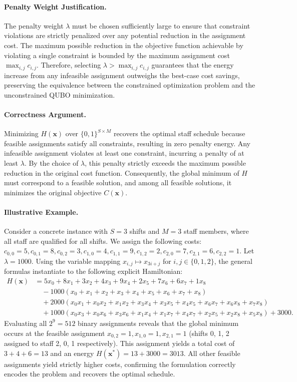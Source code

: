 \documentclass[12pt]{article}
\begin{document}
\paragraph{Penalty Weight Justification.}
The penalty weight $\lambda$ must be chosen sufficiently large to ensure that constraint violations are strictly penalized over any potential reduction in the assignment cost. The maximum possible reduction in the objective function achievable by violating a single constraint is bounded by the maximum assignment cost $\max_{i,j} c_{i,j}$. Therefore, selecting $\lambda > \max_{i,j} c_{i,j}$ guarantees that the energy increase from any infeasible assignment outweighs the best-case cost savings, preserving the equivalence between the constrained optimization problem and the unconstrained QUBO minimization.

\paragraph{Correctness Argument.}
Minimizing $H(\mathbf{x})$ over $\{0,1\}^{S \times M}$ recovers the optimal staff schedule because feasible assignments satisfy all constraints, resulting in zero penalty energy. Any infeasible assignment violates at least one constraint, incurring a penalty of at least $\lambda$. By the choice of $\lambda$, this penalty strictly exceeds the maximum possible reduction in the original cost function. Consequently, the global minimum of $H$ must correspond to a feasible solution, and among all feasible solutions, it minimizes the original objective $C(\mathbf{x})$.

\paragraph{Illustrative Example.}
Consider a concrete instance with $S=3$ shifts and $M=3$ staff members, where all staff are qualified for all shifts. We assign the following costs: $c_{0,0}=5, c_{0,1}=8, c_{0,2}=3, c_{1,0}=4, c_{1,1}=9, c_{1,2}=2, c_{2,0}=7, c_{2,1}=6, c_{2,2}=1$. Let $\lambda = 1000$. Using the variable mapping $x_{i,j} \mapsto x_{3i+j}$ for $i,j \in \{0,1,2\}$, the general formulas instantiate to the following explicit Hamiltonian:
\begin{align}
  H(\mathbf{x}) &= 5x_0 + 8x_1 + 3x_2 + 4x_3 + 9x_4 + 2x_5 + 7x_6 + 6x_7 + 1x_8 \nonumber \\
  &\quad - 1000(x_0 + x_1 + x_2 + x_3 + x_4 + x_5 + x_6 + x_7 + x_8) \nonumber \\
  &\quad + 2000(x_0x_1 + x_0x_2 + x_1x_2 + x_3x_4 + x_3x_5 + x_4x_5 + x_6x_7 + x_6x_8 + x_7x_8) \nonumber \\
  &\quad + 1000(x_0x_3 + x_0x_6 + x_3x_6 + x_1x_4 + x_1x_7 + x_4x_7 + x_2x_5 + x_2x_8 + x_5x_8) + 3000.
\end{align}
Evaluating all $2^9 = 512$ binary assignments reveals that the global minimum occurs at the feasible assignment $x_{0,2}=1, x_{1,0}=1, x_{2,1}=1$ (shifts 0, 1, 2 assigned to staff 2, 0, 1 respectively). This assignment yields a total cost of $3+4+6=13$ and an energy $H(\mathbf{x}^*) = 13 + 3000 = 3013$. All other feasible assignments yield strictly higher costs, confirming the formulation correctly encodes the problem and recovers the optimal schedule.
\end{document}
